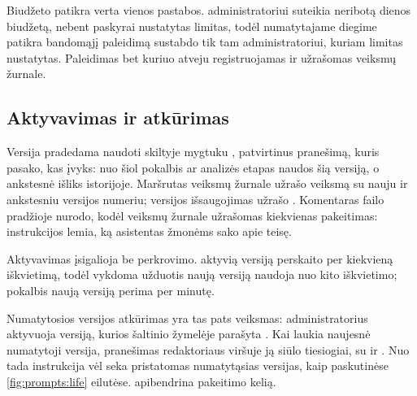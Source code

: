 Biudžeto patikra verta vienos pastabos.  administratoriui suteikia
neribotą dienos biudžetą, nebent paskyrai nustatytas limitas, todėl numatytajame diegime
patikra bandomąjį paleidimą sustabdo tik tam administratoriui, kuriam limitas nustatytas.
Paleidimas bet kuriuo atveju registruojamas ir užrašomas veiksmų žurnale.

\subsection{Aktyvavimas ir atkūrimas}\label{sec:prompts:activating}

Versija pradedama naudoti skiltyje  mygtuku , patvirtinus
pranešimą, kuris pasako, kas įvyks: nuo šiol pokalbis ar analizės etapas naudos šią versiją, o
ankstesnė išliks istorijoje. Maršrutas  veiksmų žurnale užrašo veiksmą
 su nauju ir ankstesniu versijos numeriu; versijos išsaugojimas užrašo
. Komentaras failo  pradžioje nurodo,
kodėl veiksmų žurnale užrašomas kiekvienas pakeitimas: instrukcijos lemia, ką asistentas žmonėms sako apie teisę.

Aktyvavimas įsigalioja be perkrovimo.  aktyvią versiją perskaito per
kiekvieną iškvietimą, todėl vykdoma užduotis naują versiją naudoja nuo kito iškvietimo;
pokalbis naują versiją perima per minutę.

Numatytosios versijos atkūrimas yra tas pats veiksmas: administratorius aktyvuoja versiją,
kurios šaltinio žymelėje parašyta . Kai laukia naujesnė numatytoji versija,
pranešimas redaktoriaus viršuje ją siūlo tiesiogiai, su  ir .
Nuo tada instrukcija vėl seka pristatomas numatytąsias versijas, kaip paskutinėse
\cref{fig:prompts:life} eilutėse.  apibendrina pakeitimo kelią.

